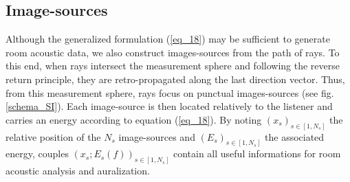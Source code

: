 \documentclass{aes2e}
\begin{document}
\begin{table}[t]
	\end{table}
\addtocounter{footnote}{-1}
\addtocounter{footnote}{1}


\subsection{Image-sources}
\label{is}
Although the generalized formulation (\ref{eq_18}) may be sufficient to generate room acoustic data, we also construct images-sources from the path of rays. To this end, when rays intersect the measurement sphere and following the reverse return principle, they are retro-propagated along the last direction vector. Thus, from this measurement sphere, rays focus on punctual images-sources (see fig. \ref{schema_SI}). Each image-source is then located relatively to the listener and carries an energy according to equation (\ref{eq_18}). By noting $(x_s)_{s \in [1, N_s]}$ the relative position of the $N_s$ image-sources and $(E_s)_{s \in [1, N_s]}$ the associated energy, couples $(x_s;E_s(f))_{s \in [1, N_s]}$ contain all useful informations for room acoustic analysis and auralization. 
\end{document}
